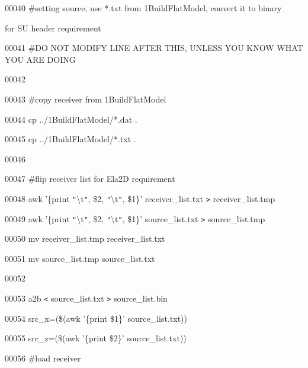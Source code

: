 \documentclass{article}
\begin{document}
\vspace{4pt}
00040 \#setting source, use *.txt from 1BuildFlatModel, convert it to binary 

\vspace{4pt}
for SU header requirement

\vspace{4pt}
00041 \#DO NOT MODIFY LINE AFTER THIS, UNLESS YOU KNOW WHAT YOU ARE DOING

\vspace{4pt}
00042 

\vspace{4pt}
00043 \#copy receiver from 1BuildFlatModel

\vspace{4pt}
00044 cp ../1BuildFlatModel/*.dat .

\vspace{4pt}
00045 cp ../1BuildFlatModel/*.txt .

\vspace{4pt}
00046 

\vspace{4pt}
00047 \#flip receiver list for Ela2D requirement

\vspace{4pt}
00048 awk '\{print \texttt{"}\textbackslash{}t\texttt{"}, \$2, \texttt{"}\textbackslash{}t\texttt{"}, 
\$1\}' receiver\_list.txt \texttt{>} receiver\_list.tmp 

\vspace{4pt}
00049 awk '\{print \texttt{"}\textbackslash{}t\texttt{"}, \$2, \texttt{"}\textbackslash{}t\texttt{"}, 
\$1\}' source\_list.txt \texttt{>} source\_list.tmp

\vspace{4pt}
00050 mv receiver\_list.tmp receiver\_list.txt

\vspace{4pt}
00051 mv source\_list.tmp source\_list.txt

\vspace{4pt}
00052 

\vspace{4pt}
00053 a2b \texttt{<} source\_list.txt \texttt{>} source\_list.bin

\vspace{4pt}
00054 src\_x=(\$(awk '\{print \$1\}' source\_list.txt))

\vspace{4pt}
00055 src\_z=(\$(awk '\{print \$2\}' source\_list.txt))

\vspace{4pt}
00056 \#load receiver
\end{document}
